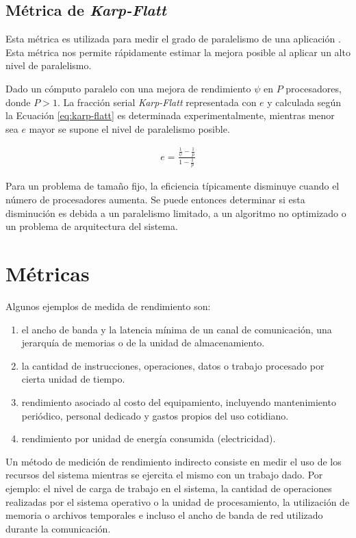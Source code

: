 \documentclass[a4paper]{report}
\begin{document}
\subsection{Métrica de {\it Karp-Flatt}}

Esta métrica es utilizada para medir el grado de paralelismo de una aplicación \cite{karp-flatt}. Esta métrica nos permite rápidamente estimar la mejora posible al aplicar un alto nivel de paralelismo.

\bigskip

Dado un cómputo paralelo con una mejora de rendimiento $ \psi $ en $ P $
procesadores, donde $ P > 1 $. La fracción serial {\it Karp-Flatt} representada con $ e $ y calculada según la Ecuación \ref{eq:karp-flatt} es determinada experimentalmente, mientras menor sea $ e $ mayor se supone el nivel de paralelismo posible.

\begin{eqnarray}
\label{eq:karp-flatt}
 e = \frac{\frac{1}{\psi} - \frac{1}{p}}{1 - \frac{1}{p}} 
\end{eqnarray}

Para un problema de tamaño fijo, la eficiencia típicamente disminuye cuando
el número de procesadores aumenta. Se puede entonces determinar si esta disminución
es debida a un paralelismo limitado, a un algoritmo no optimizado o un problema de
arquitectura del sistema.

\section{Métricas}

Algunos ejemplos de medida de rendimiento son:

\begin{enumerate}
\item el ancho de banda y la latencia mínima de un canal de comunicación,
  una jerarquía de memorias o de la unidad de almacenamiento.
\item la cantidad de instrucciones, operaciones, datos o trabajo procesado
  por cierta unidad de tiempo.
\item rendimiento asociado al costo del equipamiento, incluyendo mantenimiento
 periódico, personal dedicado y gastos propios del uso cotidiano.
\item rendimiento por unidad de energía consumida (electricidad).

\end{enumerate}

Un método de medición de rendimiento indirecto consiste en medir el uso de
los recursos del sistema mientras se ejercita el mismo con un trabajo dado.
Por ejemplo: el nivel de carga de trabajo en el sistema, la cantidad de operaciones realizadas por el
sistema operativo o la unidad de procesamiento, la utilización de memoria o
archivos temporales e incluso el ancho de banda de red utilizado durante la comunicación.
\end{document}
